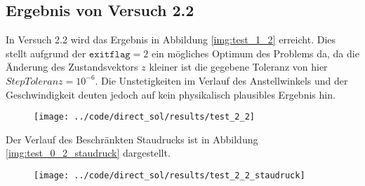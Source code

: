\subsection{Ergebnis von Versuch 2.2}\label{kap:Versuch22}
In Versuch 2.2 wird das Ergebnis in Abbildung \ref{img:test_1_2} erreicht. Dies stellt aufgrund der $\texttt{exitflag} = 2$ ein mögliches Optimum des Problems da, da die Änderung des Zustandsvektors $z$ kleiner ist die gegebene Toleranz von hier $StepToleranz = 10^{-6}$. Die Unstetigkeiten im Verlauf des Anstellwinkels und der Geschwindigkeit deuten jedoch auf kein physikalisch plausibles Ergebnis hin.
\begin{figure}[H]
\begin{center}
\texttt{[image: ../code/direct\_sol/results/test\_2\_2]}
 \label{img:test_2_2}
\end{center}
\end{figure}
Der Verlauf des Beschränkten Staudrucks ist in Abbildung \ref{img:test_0_2_staudruck} dargestellt.
\begin{figure}[H]
\begin{center}
\texttt{[image: ../code/direct\_sol/results/test\_2\_2\_staudruck]}
\label{img:test_2_2_staudruck}
\end{center}
\end{figure}














\newpage
